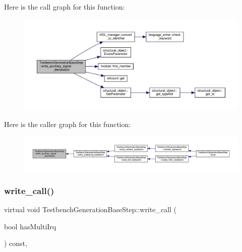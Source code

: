 Here is the call graph for this function\+:
\nopagebreak
\begin{figure}[H]
\begin{center}
\leavevmode
\includegraphics[width=350pt]{dc/d02/classTestbenchGenerationBaseStep_ae51ed1b581d6afe1f5826f767668687c_cgraph}
\end{center}
\end{figure}
Here is the caller graph for this function\+:
\nopagebreak
\begin{figure}[H]
\begin{center}
\leavevmode
\includegraphics[width=350pt]{dc/d02/classTestbenchGenerationBaseStep_ae51ed1b581d6afe1f5826f767668687c_icgraph}
\end{center}
\end{figure}
\mbox{\label{classTestbenchGenerationBaseStep_a07a88446a9b569d6776e8d20ea323809}} 
\subsubsection{\texorpdfstring{write\+\_\+call()}{write\_call()}}
{\footnotesize\ttfamily virtual void Testbench\+Generation\+Base\+Step\+::write\+\_\+call (\begin{DoxyParamCaption}\item[{bool}]{has\+Multi\+Irq }\end{DoxyParamCaption}) const\hspace{0.3cm}{\ttfamily [protected]}, {}}



